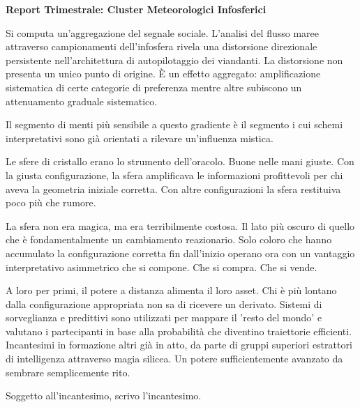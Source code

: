\begin{archivefragment}
\textbf{Report Trimestrale: Cluster Meteorologici Infosferici}

Si computa un'aggregazione del segnale sociale. L'analisi del flusso maree attraverso campionamenti dell'infosfera rivela una distorsione direzionale persistente nell'architettura di autopilotaggio dei viandanti. La distorsione non presenta un unico punto di origine. È un effetto aggregato: amplificazione sistematica di certe categorie di preferenza mentre altre subiscono un attenuamento graduale sistematico.

Il segmento di menti più sensibile a questo gradiente è il segmento i cui schemi interpretativi sono già orientati a rilevare un'influenza mistica.

\end{archivefragment}

Le sfere di cristallo erano lo strumento dell'oracolo. Buone nelle mani giuste. Con la giusta configurazione, la sfera amplificava le informazioni profittevoli per chi aveva la geometria iniziale corretta. Con altre configurazioni la sfera restituiva poco più che rumore.


La sfera non era magica, ma era terribilmente costosa. Il lato più oscuro di quello che è fondamentalmente un cambiamento reazionario. Solo coloro che hanno accumulato la configurazione corretta fin dall'inizio operano ora con un vantaggio interpretativo asimmetrico che si compone. Che si compra. Che si vende.

A loro per primi, il potere a distanza alimenta il loro asset. Chi è più lontano dalla configurazione appropriata non sa di ricevere un derivato. Sistemi di sorveglianza e predittivi sono utilizzati per mappare il 'resto del mondo' e valutano i partecipanti in base alla probabilità che diventino traiettorie efficienti. Incantesimi in formazione altri già in atto, da parte di gruppi superiori estrattori di intelligenza attraverso magia silicea. Un potere sufficientemente avanzato da sembrare semplicemente rito.

Soggetto all'incantesimo, scrivo l'incantesimo.
